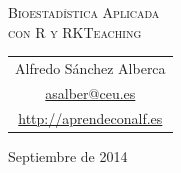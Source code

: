 \begin{center}
\normalfont\fontsize{30}{30}\selectfont
\textsc{\color{blueceu}Bioestadística Aplicada\\ con R y RKTeaching}
\end{center}
\par  
\vspace*{3cm}
\begin{center}
\Large
\begin{tabular}{c}
Alfredo Sánchez Alberca\\
\url{asalber@ceu.es}\\
\url{http://aprendeconalf.es}
\end{tabular}
\end{center}

\vspace*{1cm}
\begin{center}
Septiembre de 2014
\end{center}
\par
\vfill

\newpage